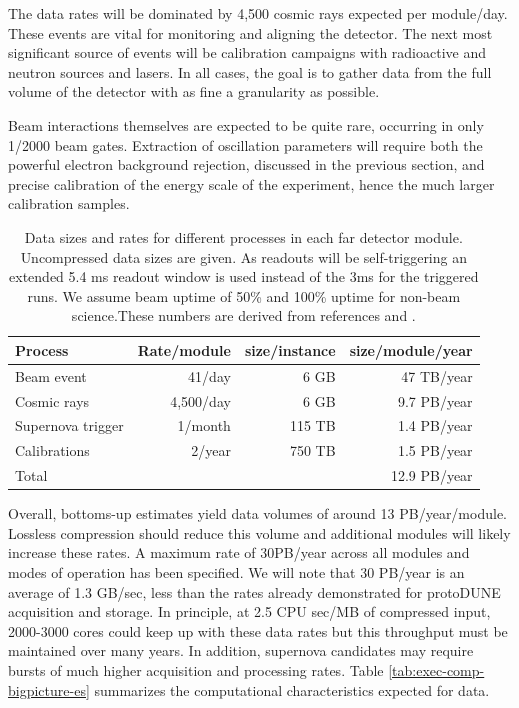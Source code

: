 The data rates will be dominated by 4,500 cosmic rays expected per module/day.  These events are vital for monitoring and aligning the detector.  The next most significant source of events will be calibration campaigns with radioactive and neutron sources and lasers.  In all cases, the goal is to gather data from the full volume of the detector with as fine a granularity as possible. 

Beam interactions themselves are expected to be quite rare, occurring in only 1/2000 beam gates.  Extraction of oscillation parameters will require both the powerful electron background rejection, discussed in the previous section,  and precise calibration of the energy scale of the experiment, hence the much larger calibration samples. 

 \begin{table}[htp]

\begin{center}
\begin{tabular}{|l |r r r |}
\hline
Process & Rate/module & \qquad size/instance &\qquad  size/module/year\\
\hline
Beam event & 41/day & 6 GB&47 TB/year\\
Cosmic rays &4,500/day&  6 GB& 9.7 PB/year\\
Supernova trigger& 1/month& 115 TB& 1.4 PB/year\\
Calibrations&2/year&750 TB& 1.5 PB/year\\
\hline 
Total& & &12.9 PB/year\\
\hline
\end{tabular}
\end{center}
\caption{Data sizes and rates for different processes in each far detector module.  Uncompressed data sizes are given. As readouts will be self-triggering an extended 5.4 ms readout window is used instead of the 3ms for the triggered  runs.  We assume beam uptime of 50\% and 100\% uptime for non-beam science.These numbers are derived from references and .}
\label{volumes}
\end{table}%

Overall, bottoms-up estimates yield data volumes of around 13 PB/year/module.  Lossless compression should reduce this volume and additional modules will likely increase these rates.  A maximum rate of 30PB/year across all modules and modes of operation has been specified.  We will note that 30 PB/year is  an average of 1.3 GB/sec, less than the rates already demonstrated for protoDUNE acquisition and storage.  In principle, at 2.5 CPU sec/MB of compressed input, 2000-3000 cores could keep up with these data rates  but this throughput must be maintained over many years.   In addition, supernova candidates may require bursts of  much higher acquisition and processing rates. Table \ref{tab:exec-comp-bigpicture-es} summarizes the computational characteristics expected for  data. 


